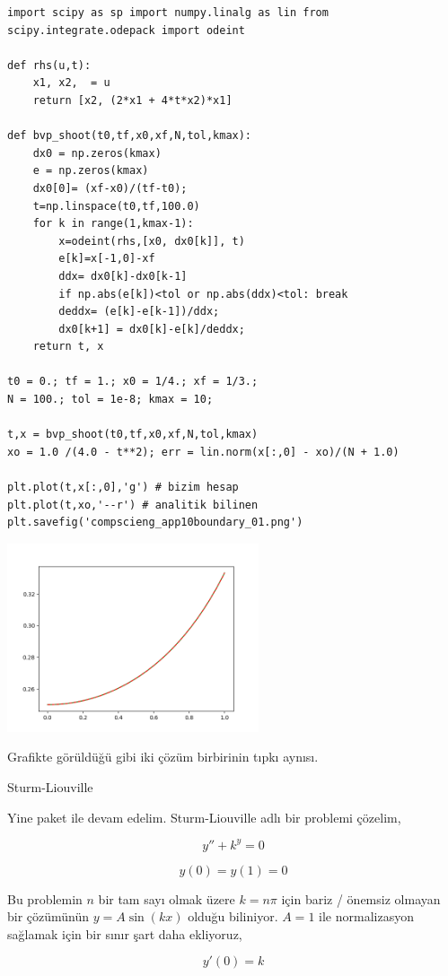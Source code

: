 \documentclass[12pt,fleqn]{article}\usepackage{../../common}
\begin{document}
\begin{verbatim}
import scipy as sp import numpy.linalg as lin from
scipy.integrate.odepack import odeint

def rhs(u,t):
    x1, x2,  = u
    return [x2, (2*x1 + 4*t*x2)*x1]

def bvp_shoot(t0,tf,x0,xf,N,tol,kmax):
    dx0 = np.zeros(kmax)
    e = np.zeros(kmax)
    dx0[0]= (xf-x0)/(tf-t0);
    t=np.linspace(t0,tf,100.0)
    for k in range(1,kmax-1):
        x=odeint(rhs,[x0, dx0[k]], t)        
        e[k]=x[-1,0]-xf
        ddx= dx0[k]-dx0[k-1]
        if np.abs(e[k])<tol or np.abs(ddx)<tol: break
        deddx= (e[k]-e[k-1])/ddx;
        dx0[k+1] = dx0[k]-e[k]/deddx;
    return t, x

t0 = 0.; tf = 1.; x0 = 1/4.; xf = 1/3.;
N = 100.; tol = 1e-8; kmax = 10;

t,x = bvp_shoot(t0,tf,x0,xf,N,tol,kmax)
xo = 1.0 /(4.0 - t**2); err = lin.norm(x[:,0] - xo)/(N + 1.0)

plt.plot(t,x[:,0],'g') # bizim hesap
plt.plot(t,xo,'--r') # analitik bilinen
plt.savefig('compscieng_app10boundary_01.png')
\end{verbatim}

\includegraphics[width=20em]{compscieng_app10boundary_01.png}

Grafikte görüldüğü gibi iki çözüm birbirinin tıpkı aynısı. 

Sturm-Liouville

Yine paket ile devam edelim. Sturm-Liouville adlı bir problemi çözelim, 

$$
y'' + k^y = 0
$$

$$
y(0) = y(1) = 0
$$

Bu problemin $n$ bir tam sayı olmak üzere $k = n \pi$ için bariz / önemsiz
olmayan bir çözümünün $y=A\sin(kx)$ olduğu biliniyor. $A=1$ ile normalizasyon
sağlamak için bir sınır şart daha ekliyoruz,

$$
y'(0) = k
$$
\end{document}
